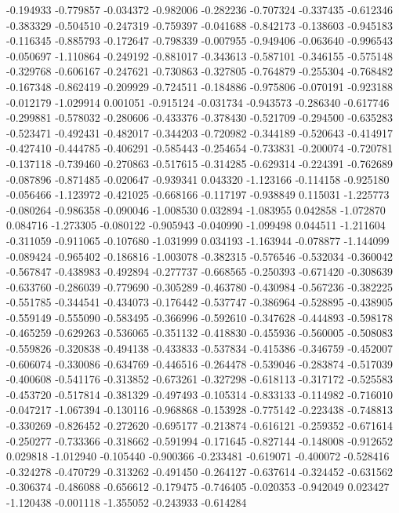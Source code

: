 -0.194933
-0.779857
-0.034372
-0.982006
-0.282236
-0.707324
-0.337435
-0.612346
-0.383329
-0.504510
-0.247319
-0.759397
-0.041688
-0.842173
-0.138603
-0.945183
-0.116345
-0.885793
-0.172647
-0.798339
-0.007955
-0.949406
-0.063640
-0.996543
-0.050697
-1.110864
-0.249192
-0.881017
-0.343613
-0.587101
-0.346155
-0.575148
-0.329768
-0.606167
-0.247621
-0.730863
-0.327805
-0.764879
-0.255304
-0.768482
-0.167348
-0.862419
-0.209929
-0.724511
-0.184886
-0.975806
-0.070191
-0.923188
-0.012179
-1.029914
0.001051
-0.915124
-0.031734
-0.943573
-0.286340
-0.617746
-0.299881
-0.578032
-0.280606
-0.433376
-0.378430
-0.521709
-0.294500
-0.635283
-0.523471
-0.492431
-0.482017
-0.344203
-0.720982
-0.344189
-0.520643
-0.414917
-0.427410
-0.444785
-0.406291
-0.585443
-0.254654
-0.733831
-0.200074
-0.720781
-0.137118
-0.739460
-0.270863
-0.517615
-0.314285
-0.629314
-0.224391
-0.762689
-0.087896
-0.871485
-0.020647
-0.939341
0.043320
-1.123166
-0.114158
-0.925180
-0.056466
-1.123972
-0.421025
-0.668166
-0.117197
-0.938849
0.115031
-1.225773
-0.080264
-0.986358
-0.090046
-1.008530
0.032894
-1.083955
0.042858
-1.072870
0.084716
-1.273305
-0.080122
-0.905943
-0.040990
-1.099498
0.044511
-1.211604
-0.311059
-0.911065
-0.107680
-1.031999
0.034193
-1.163944
-0.078877
-1.144099
-0.089424
-0.965402
-0.186816
-1.003078
-0.382315
-0.576546
-0.532034
-0.360042
-0.567847
-0.438983
-0.492894
-0.277737
-0.668565
-0.250393
-0.671420
-0.308639
-0.633760
-0.286039
-0.779690
-0.305289
-0.463780
-0.430984
-0.567236
-0.382225
-0.551785
-0.344541
-0.434073
-0.176442
-0.537747
-0.386964
-0.528895
-0.438905
-0.559149
-0.555090
-0.583495
-0.366996
-0.592610
-0.347628
-0.444893
-0.598178
-0.465259
-0.629263
-0.536065
-0.351132
-0.418830
-0.455936
-0.560005
-0.508083
-0.559826
-0.320838
-0.494138
-0.433833
-0.537834
-0.415386
-0.346759
-0.452007
-0.606074
-0.330086
-0.634769
-0.446516
-0.264478
-0.539046
-0.283874
-0.517039
-0.400608
-0.541176
-0.313852
-0.673261
-0.327298
-0.618113
-0.317172
-0.525583
-0.453720
-0.517814
-0.381329
-0.497493
-0.105314
-0.833133
-0.114982
-0.716010
-0.047217
-1.067394
-0.130116
-0.968868
-0.153928
-0.775142
-0.223438
-0.748813
-0.330269
-0.826452
-0.272620
-0.695177
-0.213874
-0.616121
-0.259352
-0.671614
-0.250277
-0.733366
-0.318662
-0.591994
-0.171645
-0.827144
-0.148008
-0.912652
0.029818
-1.012940
-0.105440
-0.900366
-0.233481
-0.619071
-0.400072
-0.528416
-0.324278
-0.470729
-0.313262
-0.491450
-0.264127
-0.637614
-0.324452
-0.631562
-0.306374
-0.486088
-0.656612
-0.179475
-0.746405
-0.020353
-0.942049
0.023427
-1.120438
-0.001118
-1.355052
-0.243933
-0.614284
